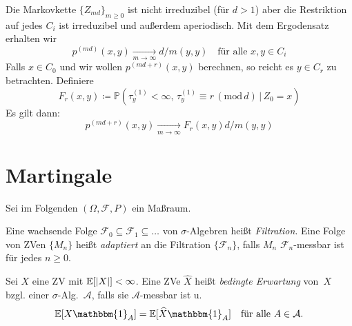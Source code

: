 \documentclass{cheat-sheet}
\renewcommand{\P}{\mathbb{P}} %
\newcommand{\E}{\mathbb{E}} %
\newcommand{\ind}{\mathbbm{1}} %
\newcommand{\iid}{i.\,i.\,d.} %
\newcommand{\Filt}{\mathcal{F}} %
\begin{document}
\begin{samepage}

\begin{bem}
  Die Markovkette $\{ Z_{md} \}_{m \geq 0}$ ist nicht irreduzibel (für $d > 1$) aber die Restriktion auf jedes $C_i$ ist irreduzibel und außerdem aperiodisch.
  Mit dem Ergodensatz erhalten wir
  \[
    p^{(md)}(x, y) \xrightarrow[m \to \infty]{} d / m(y, y)
    \quad \text{für alle $x, y \in C_i$}
  \]
  Falls $x \in C_0$ und wir wollen $p^{(md + r)}(x, y)$ berechnen, so reicht es $y \in C_r$ zu betrachten.
  Definiere
  \[
    F_r(x, y) \coloneqq \P(\tau_y^{(1)} < \infty, \, \tau_y^{(1)} \equiv r \, (\mathrm{mod}\, d) \,|\, Z_0 = x)
  \]
  Es gilt dann:
  \[
    p^{(md+r)}(x, y) \xrightarrow[m \to \infty]{} F_r(x, y) d / m(y, y)
  \]
\end{bem}


\columnbreak

\section{Martingale}

\end{samepage}


\begin{setting}
  Sei im Folgenden $(\Omega, \mathcal{F}, P)$ ein Maßraum.
\end{setting}

\begin{defn}
  Eine wachsende Folge $\Filt_0 \subseteq \Filt_1 \subseteq \ldots$ von $\sigma$-Algebren heißt \emph{Filtration}.
  Eine Folge von ZVen $\{ M_n \}$ heißt \emph{adaptiert} an die Filtration $\{ \Filt_n \}$, falls $M_n$ $\Filt_n$-messbar ist für jedes $n \geq 0$.
\end{defn}

\begin{defn}
  Sei $X$ eine ZV mit $\E[\abs{X}] < \infty$.
  Eine ZVe $\widehat{X}$ heißt \emph{bedingte Erwartung} von~$X$ bzgl. einer $\sigma$-Alg.~$\mathcal{A}$, falls sie $\mathcal{A}$-messbar ist u.
  \[
    \E[X \ind_A] = \E[\widehat{X} \ind_A] \quad
    \text{für alle $A \in \mathcal{A}$.}
  \]
\end{defn}
\end{document}
